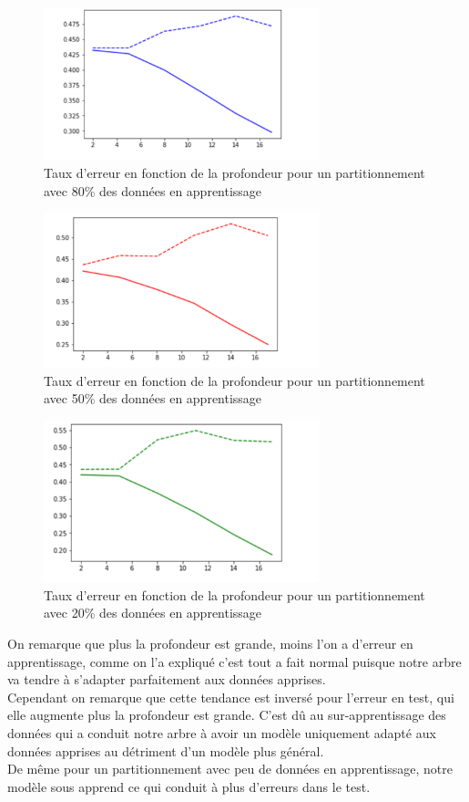 \documentclass{article}
\begin{document}
\begin{figure}[h]
	\center
	\includegraphics[width=8cm]{figure/tme1/08ap.png} 
	 \caption{Taux d'erreur en fonction de la profondeur pour un partitionnement avec 80\% des données en apprentissage }
	 
\end{figure}
\begin{figure}[h]
	\center
	\includegraphics[width=8cm]{figure/tme1/05ap.png} 
	 \caption{Taux d'erreur en fonction de la profondeur pour un partitionnement avec 50\% des données en apprentissage }
	 
\end{figure}
\begin{figure}[h]
	\center
	\includegraphics[width=8cm]{figure/tme1/02ap.png} 
	 \caption{Taux d'erreur en fonction de la profondeur pour un partitionnement avec 20\% des données en apprentissage }
	 
\end{figure}

On remarque que plus la profondeur est grande, moins l'on a d'erreur en apprentissage, comme on l'a expliqué c'est tout a fait normal puisque notre arbre va tendre à s'adapter parfaitement aux données apprises.\\Cependant on remarque que cette tendance est inversé pour l'erreur en test, qui elle augmente plus la profondeur est grande. C'est dû au sur-apprentissage des données qui a conduit notre arbre à avoir un modèle uniquement adapté aux données apprises au détriment d'un modèle plus général.\\
De même pour un partitionnement avec peu de données en apprentissage, notre modèle sous apprend ce qui conduit à plus d'erreurs dans le test.
\clearpage
\end{document}
